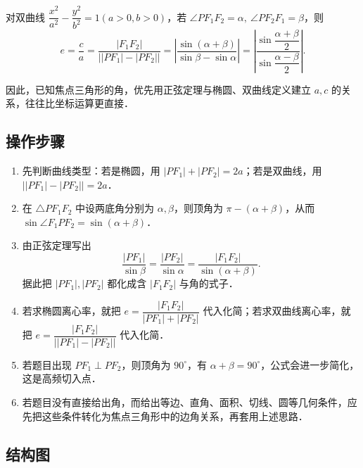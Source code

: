 \documentclass[UTF8,a4paper,11pt]{ctexart}
\begin{document}
对双曲线 $\dfrac{x^2}{a^2}-\dfrac{y^2}{b^2}=1(a>0,b>0)$，若 $\angle PF_1F_2=\alpha,\ \angle PF_2F_1=\beta$，则
\[
e=\frac{c}{a}=\frac{|F_1F_2|}{\bigl||PF_1|-|PF_2|\bigr|}
=\left|\frac{\sin(\alpha+\beta)}{\sin\beta-\sin\alpha}\right|
=\left|\frac{\sin\dfrac{\alpha+\beta}{2}}{\sin\dfrac{\alpha-\beta}{2}}\right|.
\]

因此，已知焦点三角形的角，优先用正弦定理与椭圆、双曲线定义建立 $a,c$ 的关系，往往比坐标运算更直接．

\subsection*{操作步骤}

\begin{enumerate}

\item 先判断曲线类型：若是椭圆，用 $|PF_1|+|PF_2|=2a$；若是双曲线，用 $\bigl||PF_1|-|PF_2|\bigr|=2a$．

\item 在 $\triangle PF_1F_2$ 中设两底角分别为 $\alpha,\beta$，则顶角为 $\pi-(\alpha+\beta)$，从而 $\sin\angle F_1PF_2=\sin(\alpha+\beta)$．

\item 由正弦定理写出
\[
\frac{|PF_1|}{\sin\beta}=\frac{|PF_2|}{\sin\alpha}=\frac{|F_1F_2|}{\sin(\alpha+\beta)}.
\]
据此把 $|PF_1|,|PF_2|$ 都化成含 $|F_1F_2|$ 与角的式子．

\item 若求椭圆离心率，就把 $e=\dfrac{|F_1F_2|}{|PF_1|+|PF_2|}$ 代入化简；若求双曲线离心率，就把 $e=\dfrac{|F_1F_2|}{\bigl||PF_1|-|PF_2|\bigr|}$ 代入化简．

\item 若题目出现 $PF_1\perp PF_2$，则顶角为 $90^\circ$，有 $\alpha+\beta=90^\circ$，公式会进一步简化，这是高频切入点．

\item 若题目没有直接给出角，而给出等边、直角、面积、切线、圆等几何条件，应先把这些条件转化为焦点三角形中的边角关系，再套用上述思路．

\end{enumerate}

\subsection*{结构图}
\end{document}
